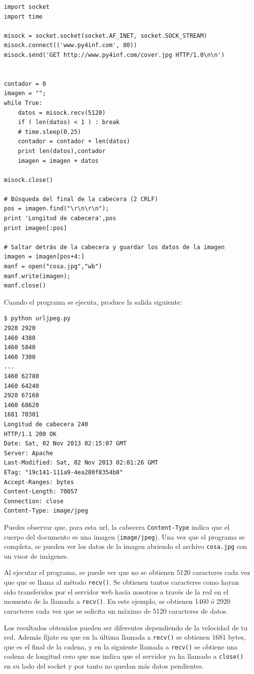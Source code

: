 \beforeverb
\begin{verbatim}
import socket
import time

misock = socket.socket(socket.AF_INET, socket.SOCK_STREAM)
misock.connect(('www.py4inf.com', 80))
misock.send('GET http://www.py4inf.com/cover.jpg HTTP/1.0\n\n')


contador = 0
imagen = "";
while True:
    datos = misock.recv(5120)
    if ( len(datos) < 1 ) : break
    # time.sleep(0.25)
    contador = contador + len(datos)
    print len(datos),contador
    imagen = imagen + datos

misock.close()

# Búsqueda del final de la cabecera (2 CRLF)
pos = imagen.find("\r\n\r\n");
print 'Longitud de cabecera',pos
print imagen[:pos]

# Saltar detrás de la cabecera y guardar los datos de la imagen
imagen = imagen[pos+4:]
manf = open("cosa.jpg","wb")
manf.write(imagen);
manf.close()
\end{verbatim}
\afterverb
%
Cuando el programa se ejecuta, produce la salida siguiente:

\beforeverb
\begin{verbatim}
$ python urljpeg.py 
2920 2920
1460 4380
1460 5840
1460 7300
...
1460 62780
1460 64240
2920 67160
1460 68620
1681 70301
Longitud de cabecera 240
HTTP/1.1 200 OK
Date: Sat, 02 Nov 2013 02:15:07 GMT
Server: Apache
Last-Modified: Sat, 02 Nov 2013 02:01:26 GMT
ETag: "19c141-111a9-4ea280f8354b8"
Accept-Ranges: bytes
Content-Length: 70057
Connection: close
Content-Type: image/jpeg
\end{verbatim}
\afterverb
%
Puedes observar que, para esta url, la
cabecera {\tt Content-Type} indica que el
cuerpo del documento es una imagen ({\tt image/jpeg}).
Una vez que el programa se completa, se pueden ver los datos de la imagen abriendo
el archivo {\tt cosa.jpg} con un visor de imágenes.

Al ejecutar el programa, se puede ver que no se obtienen 5120 caracteres
cada vez que que se llama al método {\tt recv()}.
Se obtienen tantos caracteres como hayan sido transferidos por el servidor web hacia nosotros
a través de la red en el momento de la llamada a {\tt recv()}.
En este ejemplo, se obtienen 1460 ó 2920 caracteres cada vez que
se solicita un máximo de 5120 caracteres de datos.

Los resultados obtenidos pueden ser diferentes dependiendo de la velocidad de tu red. Además
fíjate en que en la última llamada a {\tt recv()} se obtienen 1681 bytes, que es el final
de la cadena, y en la siguiente llamada a {\tt recv()} se obtiene una cadena de
longitud cero que nos indica que el servidor ya ha llamado a {\tt close()} en su lado
del socket y por tanto no quedan más datos pendientes.

